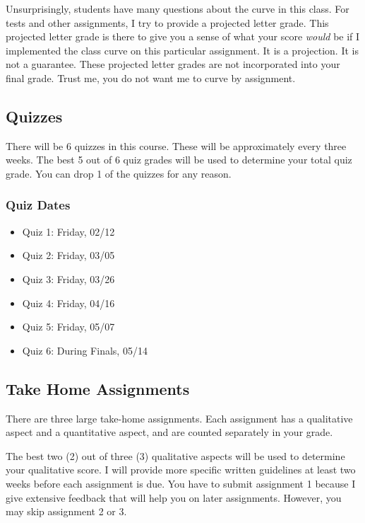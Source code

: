 \documentclass[11pt,]{article}
\begin{document}
Unsurprisingly, students have many questions about the curve in this
class. For tests and other assignments, I try to provide a projected
letter grade. This projected letter grade is there to give you a sense
of what your score \emph{would} be if I implemented the class curve on
this particular assignment. It is a projection. It is not a guarantee.
These projected letter grades are not incorporated into your final
grade. Trust me, you do not want me to curve by assignment.

\hypertarget{quizzes}{%
\subsection{Quizzes}\label{quizzes}}

There will be 6 quizzes in this course. These will be approximately
every three weeks. The best 5 out of 6 quiz grades will be used to
determine your total quiz grade. You can drop 1 of the quizzes for any
reason.

\hypertarget{quiz-dates}{%
\subsubsection{Quiz Dates}\label{quiz-dates}}

\begin{itemize}
\item
  Quiz 1: Friday, 02/12
\item
  Quiz 2: Friday, 03/05
\item
  Quiz 3: Friday, 03/26
\item
  Quiz 4: Friday, 04/16
\item
  Quiz 5: Friday, 05/07
\item
  Quiz 6: During Finals, 05/14
\end{itemize}

\hypertarget{take-home-assignments}{%
\subsection{Take Home Assignments}\label{take-home-assignments}}

There are three large take-home assignments. Each assignment has a
qualitative aspect and a quantitative aspect, and are counted separately
in your grade.

The best two (2) out of three (3) qualitative aspects will be used to
determine your qualitative score. I will provide more specific written
guidelines at least two weeks before each assignment is due. You have to
submit assignment 1 because I give extensive feedback that will help you
on later assignments. However, you may skip assignment 2 or 3.
\end{document}
